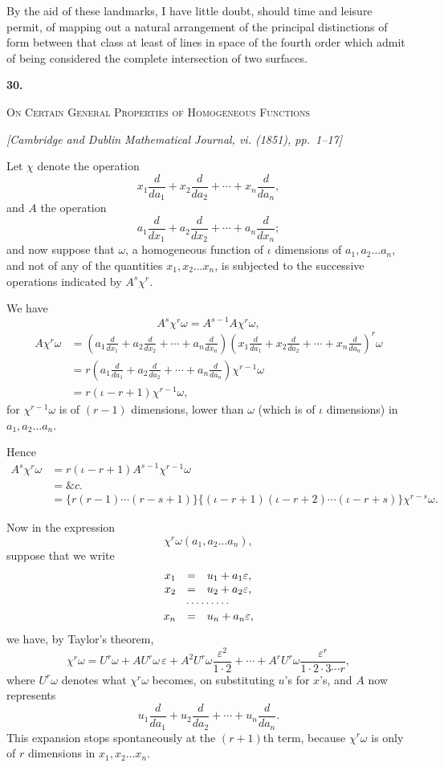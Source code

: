 \documentclass[11pt]{article}
\newcommand{\paperhead}[3]{%
  \clearpage
  \begin{center}
  {\Large\bfseries #1.}\par\vspace{0.85em}
  {\large\scshape #2}\par\vspace{0.6em}
  {\itshape [#3]}\par
  \end{center}\vspace{0.4em}}
\newcommand{\sourcepage}[1]{\marginpar{\scriptsize p.~#1}}
\newcommand{\eps}{\varepsilon}
\begin{document}
{{By the aid of these landmarks, I have little doubt, should time and leisure permit, of mapping out a natural arrangement of the principal distinctions of form between that class at least of lines in space of the fourth order which admit of being considered the complete intersection of two surfaces.

\paperhead{30}{On Certain General Properties of Homogeneous Functions}{Cambridge and Dublin Mathematical Journal, vi. (1851), pp.~1--17}

\sourcepage{165}
Let $\chi$ denote the operation
\[
 x_1\frac{d}{da_1}+x_2\frac{d}{da_2}+\cdots+x_n\frac{d}{da_n},
\]
and $A$ the operation
\[
 a_1\frac{d}{dx_1}+a_2\frac{d}{dx_2}+\cdots+a_n\frac{d}{dx_n};
\]
and now suppose that $\omega$, a homogeneous function of $\iota$ dimensions of $a_1,a_2\ldots a_n$, and not of any of the quantities $x_1,x_2\ldots x_n$, is subjected to the successive operations indicated by $A^s\chi^r$.

We have
\[
 A^s\chi^r\omega=A^{s-1}A\chi^r\omega,
\]
\[
\begin{aligned}
A\chi^r\omega
&=\left(a_1\frac{d}{dx_1}+a_2\frac{d}{dx_2}+\cdots+a_n\frac{d}{dx_n}\right)
  \left(x_1\frac{d}{da_1}+x_2\frac{d}{da_2}+\cdots+x_n\frac{d}{da_n}\right)^r\omega\\
&=r\left(a_1\frac{d}{da_1}+a_2\frac{d}{da_2}+\cdots+a_n\frac{d}{da_n}\right)\chi^{r-1}\omega\\
&=r(\iota-r+1)\chi^{r-1}\omega,
\end{aligned}
\]
for $\chi^{r-1}\omega$ is of $(r-1)$ dimensions, lower than $\omega$ (which is of $\iota$ dimensions) in $a_1,a_2\ldots a_n$.

Hence
\[
\begin{aligned}
A^s\chi^r\omega&=r(\iota-r+1)A^{s-1}\chi^{r-1}\omega\\
&=\&c.\\
&=\{r(r-1)\cdots(r-s+1)\}\{(\iota-r+1)(\iota-r+2)\cdots(\iota-r+s)\}\chi^{r-s}\omega.
\end{aligned}\tag{1}
\]

\sourcepage{166}
Now in the expression
\[
 \chi^r\omega(a_1,a_2\ldots a_n),
\]
suppose that we write
\[
\begin{array}{rcl}
x_1&=&u_1+a_1\eps,\\
x_2&=&u_2+a_2\eps,\\
\multicolumn{3}{c}{\cdots\cdots\cdots}\\
x_n&=&u_n+a_n\eps,
\end{array}
\]
we have, by Taylor's theorem,
\[
\chi^r\omega=U^r\omega+AU^r\omega\,\eps+A^2U^r\omega\frac{\eps^2}{1\cdot2}+\cdots+A^rU^r\omega\frac{\eps^r}{1\cdot2\cdot3\cdots r},
\]
where $U^r\omega$ denotes what $\chi^r\omega$ becomes, on substituting $u$'s for $x$'s, and $A$ now represents
\[
 u_1\frac{d}{da_1}+u_2\frac{d}{da_2}+\cdots+u_n\frac{d}{da_n}.
\]
This expansion stops spontaneously at the $(r+1)$th term, because $\chi^r\omega$ is only of $r$ dimensions in $x_1,x_2\ldots x_n$.

}}
\end{document}
